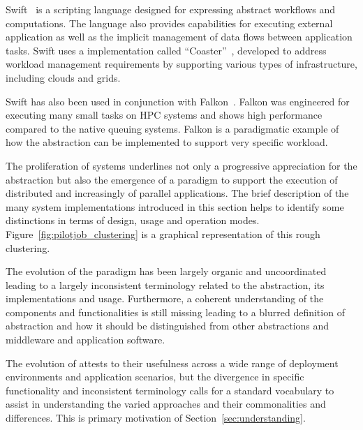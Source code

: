 \documentclass{sig-alternate}
\begin{document}
Swift~\cite{Wilde2011} is a scripting language designed for expressing abstract
workflows and computations. The language also provides capabilities for
executing external application as well as the implicit management of data flows
between application tasks. Swift uses a \pilot implementation called
``Coaster''~\cite{coasters}, developed to address workload management
requirements by supporting various types of infrastructure, including clouds
and grids.

Swift has also been used in conjunction with Falkon~\cite{1362680}. Falkon was
engineered for executing many small tasks on HPC systems and shows high
performance compared to the native queuing systems. Falkon is a paradigmatic
example of how the \pilot abstraction can be implemented to support very
specific workload.

The proliferation of \pilot systems underlines not only a progressive
appreciation for the \pilot abstraction but also the emergence of a \pilot
paradigm to support the execution of distributed and increasingly of parallel
applications. The brief description of the many \pilot system implementations
introduced in this section helps to identify some distinctions in terms of
design, usage and operation modes. Figure~\ref{fig:pilotjob_clustering} is a
graphical representation of this rough clustering.

The evolution of the \pilot paradigm has been largely organic and uncoordinated
leading to a largely inconsistent terminology related to the \pilot abstraction,
its implementations and usage. Furthermore, a coherent understanding of the
\pilot components and functionalities is still missing leading to a blurred
definition of \pilot abstraction and how it should be distinguished from other
abstractions and middleware and application software.

The evolution of \pilots attests to their usefulness across a wide range of
deployment environments and application scenarios, but the divergence in
specific functionality and inconsistent terminology calls for a standard
vocabulary to assist in understanding the varied approaches and their
commonalities and differences. This is primary motivation of
Section~\ref{sec:understanding}.




\newcommand{\vocab}[1]{\textbf{#1}\xspace}
\newcommand{\prop}[1]{\textit{#1}\xspace}
\newcommand{\impterm}[1]{\texttt{#1}\xspace}
\end{document}
